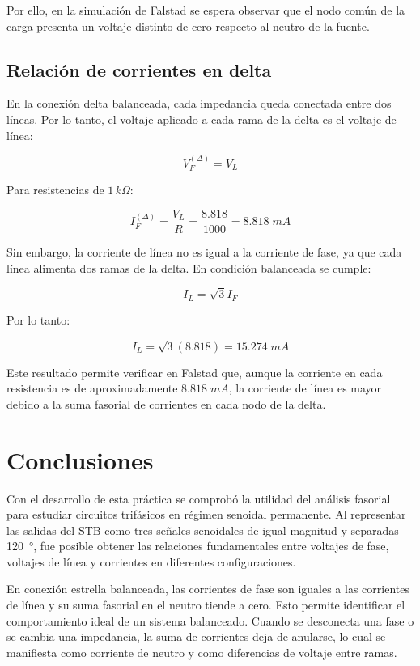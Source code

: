 Por ello, en la simulación de Falstad se espera observar que el nodo común de la carga presenta un
voltaje distinto de cero respecto al neutro de la fuente.

\subsection{Relación de corrientes en delta}

En la conexión delta balanceada, cada impedancia queda conectada entre dos líneas. Por lo tanto, el
voltaje aplicado a cada rama de la delta es el voltaje de línea:

\[
V_F^{(\Delta)} = V_L
\]

Para resistencias de $1\,k\Omega$:

\[
I_F^{(\Delta)} = \frac{V_L}{R} = \frac{8.818}{1000} = 8.818 \; mA
\]

Sin embargo, la corriente de línea no es igual a la corriente de fase, ya que cada línea alimenta dos
ramas de la delta. En condición balanceada se cumple:

\[
I_L = \sqrt{3}I_F
\]

Por lo tanto:

\[
I_L = \sqrt{3}(8.818) = 15.274 \; mA
\]

Este resultado permite verificar en Falstad que, aunque la corriente en cada resistencia es de
aproximadamente $8.818 \; mA$, la corriente de línea es mayor debido a la suma fasorial de corrientes
en cada nodo de la delta.

\section{Conclusiones}
Con el desarrollo de esta práctica se comprobó la utilidad del análisis fasorial para estudiar circuitos trifásicos en régimen senoidal permanente. Al representar las salidas del STB como tres señales senoidales de igual magnitud y separadas \SI{120}{\degree}, fue posible obtener las relaciones fundamentales entre voltajes de fase, voltajes de línea y corrientes en diferentes configuraciones.

En conexión estrella balanceada, las corrientes de fase son iguales a las corrientes de línea y su suma fasorial en el neutro tiende a cero. Esto permite identificar el comportamiento ideal de un sistema balanceado. Cuando se desconecta una fase o se cambia una impedancia, la suma de corrientes deja de anularse, lo cual se manifiesta como corriente de neutro y como diferencias de voltaje entre ramas.

